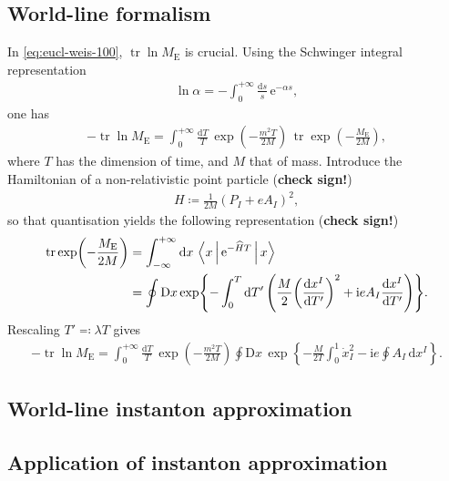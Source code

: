 \documentclass[12pt]{article}
\newcommand\mi{\mathrm{i}} %
\newcommand\me{\mathrm{e}} %
\newcommand\dif{\mathrm{d}}
\newcommand\Dif{\mathrm{D}}
\DeclareMathOperator{\tr}{tr}
\newcommand{\rbr}[1]{{\left(#1\right)}}
\newcommand{\rfun}[2]{{#1}\mathopen{}\left(#2\right)\mathclose{}}
\newcommand{\cfun}[2]{{#1}\mathopen{}\left\{#2\right\}\mathclose{}}
\newcommand{\frde}[2]{{\frac{\dif{#1}}{\dif{#2}}}}
\begin{document}
\subsection{World-line formalism}


In \cref{eq:eucl-weis-100}, $\tr\ln M_\text{E}$ is crucial. Using the Schwinger 
integral representation \cite{Schwinger1951}
\begin{align}
\ln \alpha = -\int_0^{+\infty} \frac{\dif s}{s}\,\me^{-\alpha s},
\end{align}
one has
\begin{align}
- \tr\ln M_\text{E} = \int_0^{+\infty} \frac{\dif T}{T}\,
	\rfun{\exp}{-\frac{m^2 T}{2M}}\,
	\tr \rfun{\exp}{-\frac{M_\text{E}}{2M}},
\end{align}
where $T$ has the dimension of time, and $M$ that of mass. Introduce the 
Hamiltonian of a non-relativistic point particle (\textbf{check sign!})
\begin{align}
H \coloneqq \frac{1}{2M} \rbr{P_I + e A_I}^2,
\end{align}
so that quantisation yields the following representation (\textbf{check sign!})
\begin{align}
\tr \rfun{\exp}{-\frac{M_\text{E}}{2M}} &= \int_{-\infty}^{+\infty}\dif x\,
\Braket{x | \me^{-\widehat{H} T} | x}
\\
&= \oint \Dif x\,\cfun{\exp}{-\int_{0}^{T}\dif T'\,
	\rbr{\frac{M}{2} \rbr{\frde{x^I}{T'}}^2 + \mi e A_I \frde{x^I}{T'}}}.
\end{align}
Rescaling $T' \eqqcolon \lambda T$ gives
\begin{align}
- \tr\ln M_\text{E} = \int_{0}^{+\infty} \frac{\dif T}{T}\,
	\rfun{\exp}{-\frac{m^2 T}{2M}}
	\oint \Dif x\,\cfun{\exp}{-\frac{M}{2T} \int_{0}^{1} \dot{x}_I^2
		- \mi e \oint A_I\,\dif x^I}.
\end{align}

\subsection{World-line instanton approximation}


\cite{Affleck1982}


\subsection{Application of instanton approximation}
\end{document}
